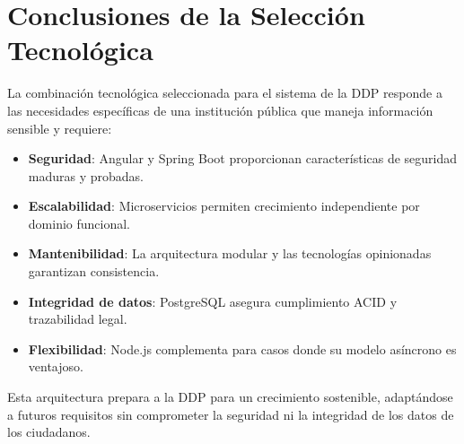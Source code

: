 \section{Conclusiones de la Selección Tecnológica}

La combinación tecnológica seleccionada para el sistema de la DDP responde a las necesidades específicas de una institución pública que maneja información sensible y requiere:

\begin{itemize}
    \item \textbf{Seguridad}: Angular y Spring Boot proporcionan características de seguridad maduras y probadas.
    \item \textbf{Escalabilidad}: Microservicios permiten crecimiento independiente por dominio funcional.
    \item \textbf{Mantenibilidad}: La arquitectura modular y las tecnologías opinionadas garantizan consistencia.
    \item \textbf{Integridad de datos}: PostgreSQL asegura cumplimiento ACID y trazabilidad legal.
    \item \textbf{Flexibilidad}: Node.js complementa para casos donde su modelo asíncrono es ventajoso.
\end{itemize}

Esta arquitectura prepara a la DDP para un crecimiento sostenible, adaptándose a futuros requisitos sin comprometer la seguridad ni la integridad de los datos de los ciudadanos.
